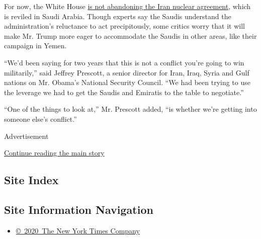 For now, the White House
\href{https://www.nytimes3xbfgragh.onion/2017/05/17/us/politics/trump-iran-nuclear-deal.html}{is
not abandoning the Iran nuclear agreement}, which is reviled in Saudi
Arabia. Though experts say the Saudis understand the administration's
reluctance to act precipitously, some critics worry that it will make
Mr. Trump more eager to accommodate the Saudis in other areas, like
their campaign in Yemen.

``We'd been saying for two years that this is not a conflict you're
going to win militarily,'' said Jeffrey Prescott, a senior director for
Iran, Iraq, Syria and Gulf nations on Mr. Obama's National Security
Council. ``We had been trying to use the leverage we had to get the
Saudis and Emiratis to the table to negotiate.''

``One of the things to look at,'' Mr. Prescott added, ``is whether we're
getting into someone else's conflict.''

Advertisement

\protect\hyperlink{after-bottom}{Continue reading the main story}

\hypertarget{site-index}{%
\subsection{Site Index}\label{site-index}}

\hypertarget{site-information-navigation}{%
\subsection{Site Information
Navigation}\label{site-information-navigation}}

\begin{itemize}
\tightlist
\item
  \href{https://help.nytimes3xbfgragh.onion/hc/en-us/articles/115014792127-Copyright-notice}{©~2020~The
  New York Times Company}
\end{itemize}

